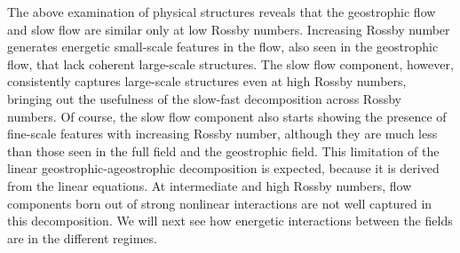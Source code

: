 \documentclass[../Rajarshi-thesis-draft.tex]{subfiles}
\begin{document}
The above examination of physical structures reveals that the geostrophic flow and slow flow are similar only at low Rossby numbers. Increasing Rossby number generates energetic small-scale features in the flow, also seen in the geostrophic flow, that lack coherent large-scale structures. The slow flow component, however, consistently captures large-scale structures even at high Rossby numbers, bringing out the usefulness of the slow-fast decomposition across Rossby numbers. Of course, the slow flow component also starts showing the presence of fine-scale features with increasing Rossby number, although they are much less than those seen in the full field and the geostrophic field. This limitation of the linear geostrophic-ageostrophic decomposition is expected, because it is derived from the linear equations. At intermediate and high Rossby numbers, flow components born out of strong nonlinear interactions are not well captured in this decomposition. We will next see how energetic interactions between the fields are in the different regimes.   %




\end{document}
